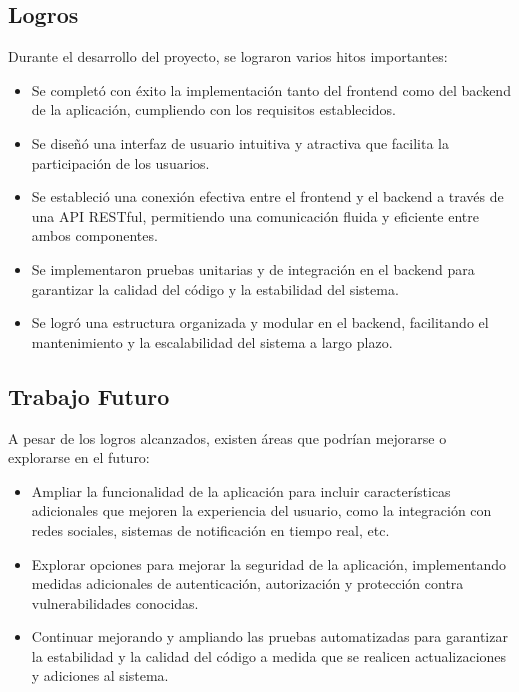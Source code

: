 \documentclass{article}
\begin{document}
\subsection{Logros}

Durante el desarrollo del proyecto, se lograron varios hitos importantes:

\begin{itemize}
    \item Se completó con éxito la implementación tanto del frontend como del backend de la aplicación, cumpliendo con los requisitos establecidos.
    \item Se diseñó una interfaz de usuario intuitiva y atractiva que facilita la participación de los usuarios.
    \item Se estableció una conexión efectiva entre el frontend y el backend a través de una API RESTful, permitiendo una comunicación fluida y eficiente entre ambos componentes.
    \item Se implementaron pruebas unitarias y de integración en el backend para garantizar la calidad del código y la estabilidad del sistema.
    \item Se logró una estructura organizada y modular en el backend, facilitando el mantenimiento y la escalabilidad del sistema a largo plazo.
\end{itemize}

\subsection{Trabajo Futuro}

A pesar de los logros alcanzados, existen áreas que podrían mejorarse o explorarse en el futuro:

\begin{itemize}
    \item Ampliar la funcionalidad de la aplicación para incluir características adicionales que mejoren la experiencia del usuario, como la integración con redes sociales, sistemas de notificación en tiempo real, etc.
    \item Explorar opciones para mejorar la seguridad de la aplicación, implementando medidas adicionales de autenticación, autorización y protección contra vulnerabilidades conocidas.
    \item Continuar mejorando y ampliando las pruebas automatizadas para garantizar la estabilidad y la calidad del código a medida que se realicen actualizaciones y adiciones al sistema.
\end{itemize}
\end{document}
